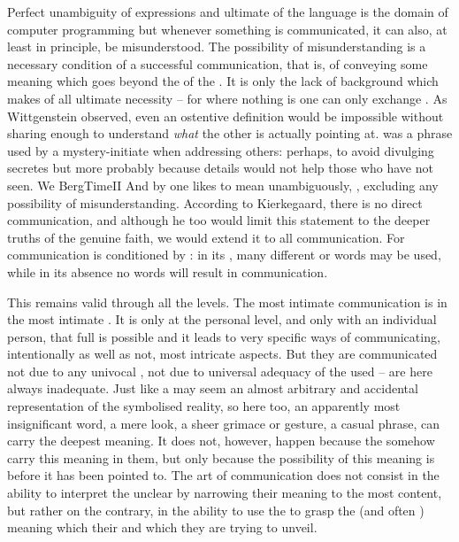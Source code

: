 Perfect unambiguity of expressions and ultimate  of the language
is the domain of computer programming but whenever something is communicated, it
can also, at least in principle, be misunderstood. The possibility of
misunderstanding is a necessary condition of a successful communication, that is,
of conveying some meaning which goes beyond the  of the .
It is only the lack of  background which makes  of all
 ultimate necessity -- for where nothing is  one can only
exchange . As Wittgenstein observed, even an ostentive definition
would be impossible without sharing enough to understand {\em what} the other is
actually pointing at.   was a
phrase used by a mystery-initiate when addressing others: perhaps, to avoid
divulging secretes but more probably because details would not help those who
have not seen.  We \citet{need not be surprised if only those ideas which least
  belong to us can be adequately expressed in words.}{BergTime}{II}
And by  one likes to mean unambiguously, ,
excluding any possibility of misunderstanding.  According to Kierkegaard, there
is no direct communication, and although he too would limit this statement to
the deeper truths of the genuine faith, we would extend it to all communication.
For communication is conditioned by : in its , many
different  or words may be used, while in its absence no words will
result in communication.

This remains valid through all the levels. The most intimate communication is
 in the most intimate .  It is only at the personal
level, and only with an individual person, that full  is possible
and it leads to very specific ways of communicating, intentionally as well as
not, most intricate aspects.  But they are communicated not due to any univocal
, not due to universal adequacy of the used  --
 are here always inadequate.  Just like a  may seem an
almost arbitrary and accidental representation of the symbolised reality, so
here too, an apparently most insignificant word, a mere look, a sheer grimace or
gesture, a casual phrase, can  carry the deepest meaning. It does
not, however, happen because the  somehow carry this meaning in them,
but only because the possibility of this meaning is  before it has
been pointed to. The art of communication does not consist in the ability to
interpret the unclear  by narrowing their meaning to the most
 content, but rather on the contrary, in the ability to use the
 to grasp the  (and often )
meaning which  their  and which they are trying to
unveil.


